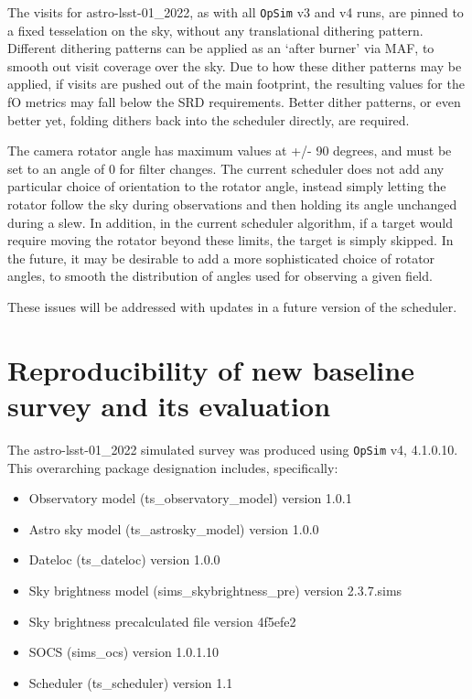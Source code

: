 \documentclass[DM,lsstdraft,authoryear,toc]{lsstdoc}
\newcommand{\opsim}{\texttt{OpSim}\xspace}
\begin{document}
The visits for astro-lsst-01\_2022, as with all \opsim v3 and v4 runs, are pinned to a fixed tesselation on the sky, without any translational dithering pattern. Different dithering patterns can be applied as an `after burner' via MAF, to smooth out visit coverage over the sky. Due to how these dither patterns may be applied, if visits are pushed out of the main footprint, the resulting values for the fO metrics may fall below the SRD requirements. Better dither patterns, or even better yet, folding dithers back into the scheduler directly, are required.

The camera rotator angle has maximum values at +/- 90 degrees, and must be set to an angle of 0 for filter changes. The current scheduler does not add any particular choice of orientation to the rotator angle, instead simply letting the rotator follow the sky during observations and then holding its angle unchanged during a slew. In addition, in the current scheduler algorithm, if a target would require moving the rotator beyond these limits, the target is simply skipped. In the future, it may be desirable to add a more sophisticated choice of rotator angles, to smooth the distribution of angles used for observing a given field.

These issues will be addressed with updates in a future version of the scheduler.

\section{Reproducibility of new baseline survey and its evaluation}

The astro-lsst-01\_2022  simulated survey was produced using \opsim v4, 4.1.0.10.  This overarching package designation includes, specifically:
\begin{itemize}
\item Observatory model (ts\_observatory\_model) version 1.0.1
\item Astro sky model (ts\_astrosky\_model) version 1.0.0
\item Dateloc (ts\_dateloc) version 1.0.0
\item Sky brightness model (sims\_skybrightness\_pre) version 2.3.7.sims
\item Sky brightness precalculated file version 4f5efe2
\item SOCS (sims\_ocs) version 1.0.1.10
\item Scheduler (ts\_scheduler) version 1.1
\end{itemize}
\end{document}
